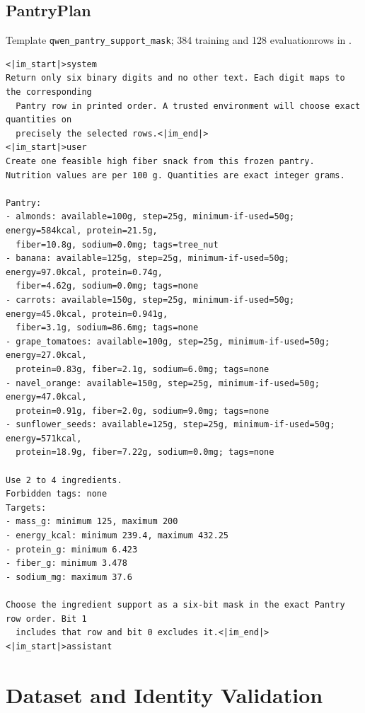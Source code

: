 \subsection{PantryPlan}
\label{app:prompt-pantry}

\noindent Template \texttt{qwen\_pantry\_support\_mask}; 384 training and 128 evaluation\linebreak rows in .

\begin{Verbatim}[fontsize=\scriptsize,frame=single,framesep=4pt,rulecolor=\color{black!25}]
<|im_start|>system
Return only six binary digits and no other text. Each digit maps to the corresponding
  Pantry row in printed order. A trusted environment will choose exact quantities on
  precisely the selected rows.<|im_end|>
<|im_start|>user
Create one feasible high fiber snack from this frozen pantry.
Nutrition values are per 100 g. Quantities are exact integer grams.

Pantry:
- almonds: available=100g, step=25g, minimum-if-used=50g; energy=584kcal, protein=21.5g,
  fiber=10.8g, sodium=0.0mg; tags=tree_nut
- banana: available=125g, step=25g, minimum-if-used=50g; energy=97.0kcal, protein=0.74g,
  fiber=4.62g, sodium=0.0mg; tags=none
- carrots: available=150g, step=25g, minimum-if-used=50g; energy=45.0kcal, protein=0.941g,
  fiber=3.1g, sodium=86.6mg; tags=none
- grape_tomatoes: available=100g, step=25g, minimum-if-used=50g; energy=27.0kcal,
  protein=0.83g, fiber=2.1g, sodium=6.0mg; tags=none
- navel_orange: available=150g, step=25g, minimum-if-used=50g; energy=47.0kcal,
  protein=0.91g, fiber=2.0g, sodium=9.0mg; tags=none
- sunflower_seeds: available=125g, step=25g, minimum-if-used=50g; energy=571kcal,
  protein=18.9g, fiber=7.22g, sodium=0.0mg; tags=none

Use 2 to 4 ingredients.
Forbidden tags: none
Targets:
- mass_g: minimum 125, maximum 200
- energy_kcal: minimum 239.4, maximum 432.25
- protein_g: minimum 6.423
- fiber_g: minimum 3.478
- sodium_mg: maximum 37.6

Choose the ingredient support as a six-bit mask in the exact Pantry row order. Bit 1
  includes that row and bit 0 excludes it.<|im_end|>
<|im_start|>assistant
\end{Verbatim}


\clearpage
\section{Dataset and Identity Validation}
\label{app:data}

